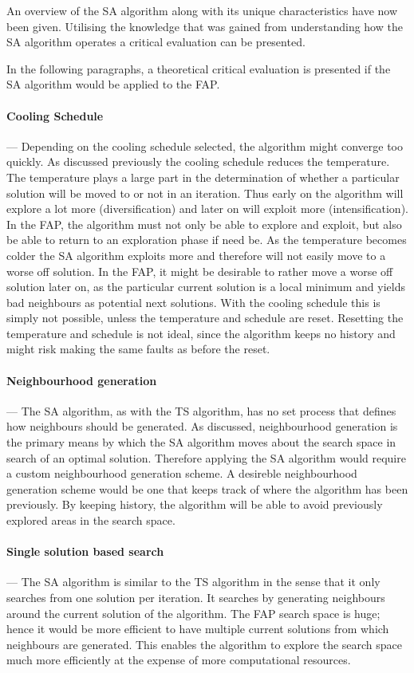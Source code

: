 An overview of the \gls{SA} algorithm along with its unique characteristics have now been given. Utilising the knowledge that was gained from understanding how the \gls{SA} algorithm operates a critical evaluation can be presented. 

In the following paragraphs, a theoretical critical evaluation is presented if the \gls{SA} algorithm would be applied to the \gls{FAP}.

\paragraph{Cooling Schedule}
--- Depending on the cooling schedule selected, the algorithm might converge too quickly. As discussed previously the cooling schedule reduces the temperature. The temperature plays a large part in the determination of whether a particular solution will be moved to or not in an iteration. Thus early on the algorithm will explore a lot more (diversification) and later on will exploit more (intensification). In the \gls{FAP}, the algorithm must not only be able to explore and exploit, but also be able to return to an exploration phase if need be.
As the temperature becomes colder the \gls{SA} algorithm exploits more and therefore will not easily move to a worse off solution. In the \gls{FAP}, it might be desirable to rather move a worse off solution later on, as the particular current solution is a local minimum and yields bad neighbours as potential next solutions. With the cooling schedule this is simply not possible, unless the temperature and schedule are reset. Resetting the temperature and schedule is not ideal, since the algorithm keeps no history and might risk making the same faults as before the reset.
\paragraph{Neighbourhood generation}
--- The \gls{SA} algorithm, as with the \gls{TS} algorithm, has no set process that defines how neighbours should be generated. As discussed, neighbourhood generation is the primary means by which the \gls{SA} algorithm moves about the search space in search of an optimal solution. Therefore applying the \gls{SA} algorithm would require a custom neighbourhood generation scheme. A desireble neighbourhood generation scheme would be one that keeps track of where the algorithm has been previously. By keeping history, the algorithm will be able to avoid previously explored areas in the search space.
\paragraph{Single solution based search}
--- The \gls{SA} algorithm is similar to the \gls{TS} algorithm in the sense that it only searches from one solution per iteration. It searches by generating neighbours around the current solution of the algorithm. The \gls{FAP} search space is huge; hence it would be more efficient to have multiple current solutions from which neighbours are generated. This enables the algorithm to explore the search space much more efficiently at the expense of more computational resources.

